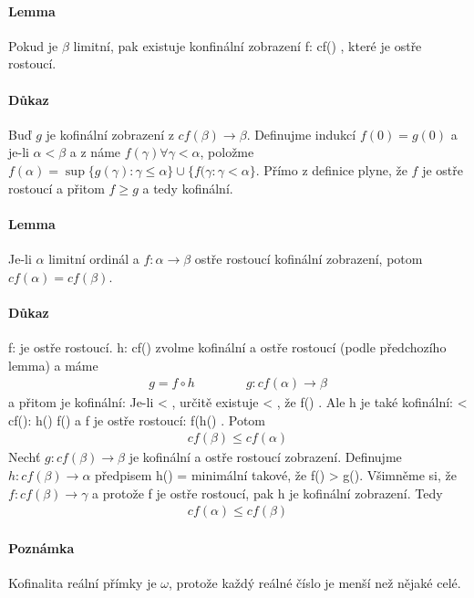 \documentclass[a4paper,12pt,titlepage]{article}
\begin{document}
\begin{enumerate}
\paragraph{Lemma}
Pokud je $\beta$ limitní, pak existuje konfinální zobrazení f: cf(\beta) \to
\beta, které je ostře rostoucí.
\paragraph{Důkaz}
Buď $g$ je kofinální zobrazení z $cf(\beta) \to \beta$. Definujme indukcí $f(0) =
g(0)$ a je-li $\alpha < \beta$ a z náme $f(\gamma) \forall \gamma < \alpha$,
položme $f(\alpha) = \sup\{g(\gamma) : \gamma \le \alpha \} \cup \{ f(\gamma:
\gamma < \alpha \}$. Přímo z definice plyne, že $f$ je ostře rostoucí a přitom $f
\ge g$ a tedy kofinální.
\paragraph{Lemma}
Je-li $\alpha$ limitní ordinál a $f : \alpha \to \beta$ ostře rostoucí kofinální
zobrazení, potom $cf(\alpha) = cf(\beta)$.
\paragraph{Důkaz}
f: \alpha \to \beta je ostře rostoucí. h: cf(\alpha) \to \alpha zvolme kofinální
a ostře rostoucí (podle předchozího lemma) a máme
\begin{align}
	g = f \circ h \qquad \qquad g: cf(\alpha) \to \beta
\end{align}
a přitom je kofinální: Je-li \gamma < \beta, určitě existuje \Delta < \alpha, že
f(\Delta) \ge \gamma. Ale h je také kofinální: \exists \etha < cf(\alpha):
h(\etha) \ge f(\Delta) a f je ostře rostoucí: f(h(\etha) \ge \gamma. Potom
\begin{align}
	cf(\beta) \le cf(\alpha)
\end{align}
Nechť $g: cf(\beta) \to \beta$ je kofinální a ostře rostoucí zobrazení.
Definujme $h: cf(\beta) \to \alpha$ předpisem h(\xi) = minimální \gamma \in
\alpha takové, že f(\gamma) > g(\gamma). Všimněme si, že $f: cf(\beta) \to
\gamma$ a protože f je ostře rostoucí, pak h je kofinální zobrazení. Tedy 
\begin{align}
	cf(\alpha) \le cf(\beta)
\end{align}
\paragraph{Poznámka}
Kofinalita reální přímky je $\omega$, protože každý reálné číslo je menší než
nějaké celé.

\end{enumerate}
\end{document}
